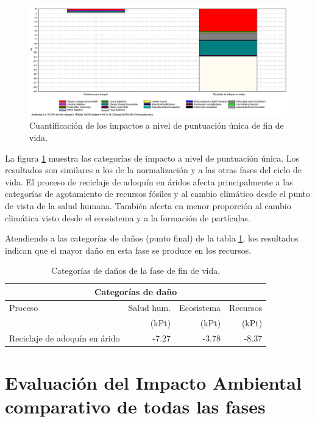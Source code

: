 \begin{figure}[!htb]
\centering
\includegraphics[width=15cm]{img/fdv_puntuacionunica.png}
\caption{Cuantificación de los impactos a nivel de puntuación única de fin de vida.}
\label{fig:fdv_puntuacionunica}
\end{figure}

La figura \ref{fig:fdv_puntuacionunica} muestra las categorías de impacto a nivel de puntuación única. Los resultados son similares a los de la normalización y a las otras fases del ciclo de vida. El proceso de reciclaje de adoquín en áridos afecta principalmente a las categorías de agotamiento de recursos fósiles y al cambio climático desde el punto de vista de la salud humana. También afecta en menor proporción al cambio climática visto desde el ecosistema y a la formación de partículas.

Atendiendo a las categorías de daños (punto final) de la tabla \ref{categoriasdanosfdv}, los resultados indican que el mayor daño en esta fase se produce en los recursos.

\begin{table}[!htb]
\centering
\begin{tabular}{p{6cm}rrr}
\toprule
\multicolumn{4}{c}{Categorías de daño}\\
\midrule
Proceso & Salud hum. & Ecosistema & Recursos\\
 & (kPt) & (kPt) & (kPt)\\
\midrule
Reciclaje de adoquín en árido & -7.27 & -3.78 & -8.37\\
\bottomrule
\end{tabular}
\caption{Categorías de daños de la fase de fin de vida.}
\label{categoriasdanosfdv}
\end{table}

\section{Evaluación del Impacto Ambiental comparativo de todas las fases}


